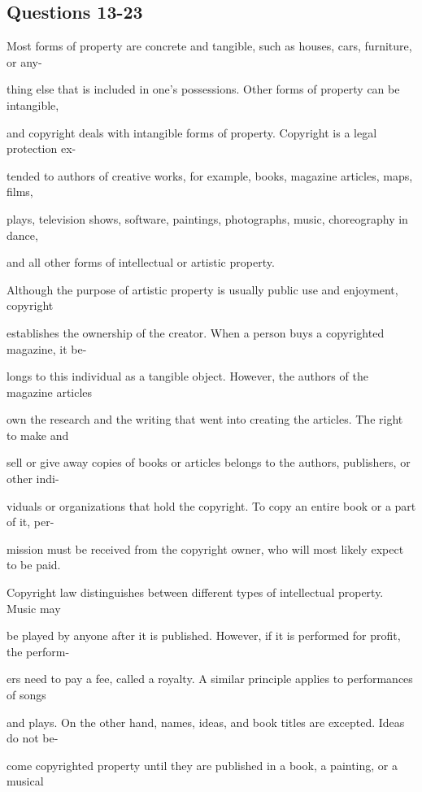\documentclass[12pt]{article}
\begin{document}
\subsection*{Questions 13-23}
\begingroup
\small
\sloppy
\setlength{\parskip}{0pt}
\setlength{\parindent}{0pt}
Most forms of property are concrete and tangible, such as houses, cars, furniture, or any-\par
thing else that is included in one's possessions. Other forms of property can be intangible,\par
and copyright deals with intangible forms of property. Copyright is a legal protection ex-\par
tended to authors of creative works, for example, books, magazine articles, maps, films,\par
plays, television shows, software, paintings, photographs, music, choreography in dance,\par
and all other forms of intellectual or artistic property.\par
Although the purpose of artistic property is usually public use and enjoyment, copyright\par
establishes the ownership of the creator. When a person buys a copyrighted magazine, it be-\par
longs to this individual as a tangible object. However, the authors of the magazine articles\par
own the research and the writing that went into creating the articles. The right to make and\par
sell or give away copies of books or articles belongs to the authors, publishers, or other indi-\par
viduals or organizations that hold the copyright. To copy an entire book or a part of it, per-\par
mission must be received from the copyright owner, who will most likely expect to be paid.\par
Copyright law distinguishes between different types of intellectual property. Music may\par
be played by anyone after it is published. However, if it is performed for profit, the perform-\par
ers need to pay a fee, called a royalty. A similar principle applies to performances of songs\par
and plays. On the other hand, names, ideas, and book titles are excepted. Ideas do not be-\par
come copyrighted property until they are published in a book, a painting, or a musical\par
\end{document}
